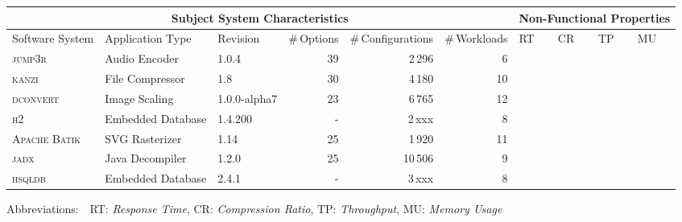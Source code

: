 \begin{tabularx}{\textwidth}{lllrrr|XXXX}
		\toprule
		\multicolumn{6}{c}{\textbf{Subject System Characteristics}} & \multicolumn{4}{c}{\textbf{Non-Functional Properties}} \\
		\midrule
		Software System &  Application Type & Revision & \#\,Options & \#\,Configurations & \#\,Workloads & RT & CR & TP & MU \\
		\midrule
		\textsc{jump3r} & Audio Encoder & 1.0.4 & 39 & 2\,296 & 6 & \xmark & \xmark &  & \xmark  \\
		
		\textsc{kanzi} & File Compressor & 1.8 & 30 & 4\,180 & 10 & \xmark & \xmark &  & \xmark  \\
			
		\textsc{dconvert} & Image Scaling & 1.0.0-alpha7 & 23 & 6\,765 & 12 & \xmark  &  &  & \xmark  \\
				
		\textsc{h2} & Embedded Database & 1.4.200 & - & 2\,xxx  & 8 &   &  & \xmark &  \\
		
		\textsc{Apache Batik} & SVG Rasterizer & 1.14 & 25 & 1\,920 &  11 & \xmark &   &  & \xmark  \\
		
		\textsc{jadx} & Java Decompiler & 1.2.0 & 25 & 10\,506 & 9 & \xmark &  &  & \xmark  \\
			
		\textsc{hsqldb} & Embedded Database & 2.4.1 & - & 3\,xxx & 8  &  &  & \xmark &  \\
		

		
		
		
		
		\bottomrule
	\end{tabularx}
	
	{\vspace{2mm}
	{\footnotesize Abbreviations:$\quad$RT: \textit{Response Time}, CR: \textit{Compression Ratio}, TP: \textit{Throughput}, MU: \textit{Memory Usage}}}
	\vspace{0.1cm}

